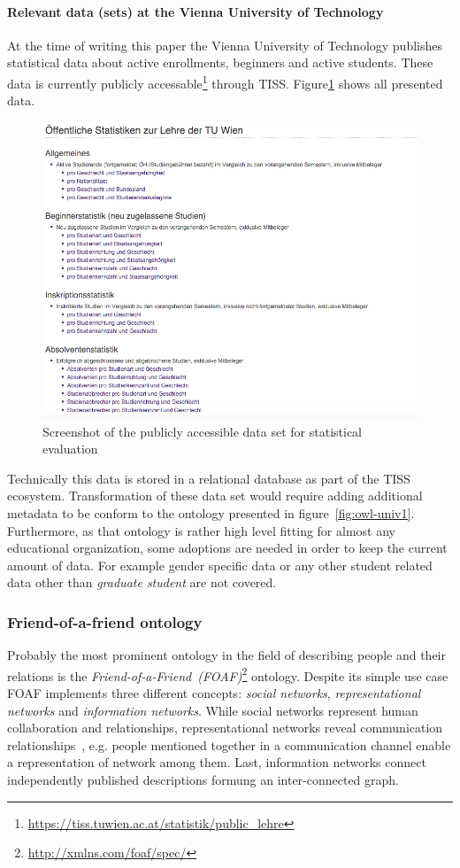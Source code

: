 \documentclass{article}
\begin{document}
\paragraph{Relevant data (sets) at the Vienna University of Technology}
At the time of writing this paper the Vienna University of Technology publishes statistical data about active enrollments, beginners and active students. These data is currently publicly accessable\footnote{\url{https://tiss.tuwien.ac.at/statistik/public_lehre}} through TISS. Figure\ref{fig:tiss-statistic} shows all presented data.
\begin{figure}[H]
	\centering \includegraphics*[width=.8\columnwidth]{tiss-statistical-data.png}
	\caption{Screenshot of the publicly accessible data set for statistical evaluation}
	\label{fig:tiss-statistic}
\end{figure}
Technically this data is stored in a relational database as part of the TISS ecosystem. Transformation of these data set would require adding additional metadata to be conform to the ontology presented in figure~\ref{fig:owl-univ1}. Furthermore, as that ontology is rather high level fitting for almost any educational organization, some adoptions are needed in order to keep the current amount of data. For example gender specific data or any other student related data other than \textit{graduate student} are not covered. 

\subsubsection{Friend-of-a-friend ontology}
Probably the most prominent ontology in the field of describing people and their relations is the \textit{Friend-of-a-Friend~(FOAF)}\footnote{\url{http://xmlns.com/foaf/spec/}} ontology. Despite its simple use case FOAF implements three different concepts: \textit{social networks}, \textit{representational networks} and \textit{information networks}. 
While social networks represent human collaboration and relationships, representational networks reveal communication relationships~\cite{book:encyclopedia-social-network}, e.g. people mentioned together in a communication channel enable a representation of network among them. Last, information networks connect independently published descriptions formung an inter-connected graph.
\end{document}
